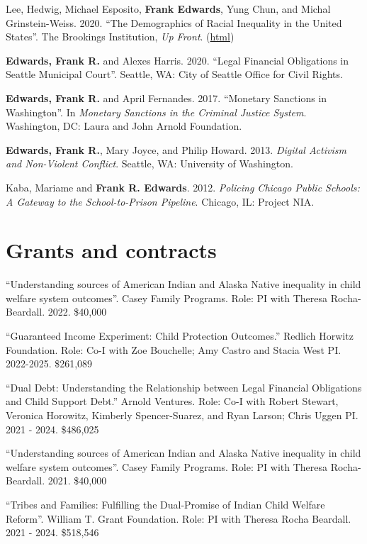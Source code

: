 \documentclass[margin,line]{res}
\begin{document}
\begin{resume}
Lee, Hedwig, Michael Esposito, \textbf{Frank Edwards}, Yung Chun, and Michal Grinstein-Weiss. 2020. ``The Demographics of Racial Inequality in the United States''. The Brookings Institution, \textit{Up Front}. (\href{https://www.brookings.edu/blog/up-front/2020/07/27/the-demographics-of-racial-inequality-in-the-united-states/}{html}) 

\textbf{Edwards, Frank R.} and Alexes Harris. 2020. ``Legal Financial Obligations in Seattle Municipal Court''. Seattle, WA: City of Seattle Office for Civil Rights.

\textbf{Edwards, Frank R.} and April Fernandes. 2017. ``Monetary Sanctions in Washington''. In \textit{Monetary Sanctions in the Criminal Justice System}. Washington, DC: Laura and John Arnold Foundation.

\textbf{Edwards, Frank R.}, Mary Joyce, and Philip Howard. 2013. \textit{Digital Activism and Non-Violent Conflict}. Seattle, WA: University of Washington.

Kaba, Mariame and \textbf{Frank R. Edwards}. 2012. \textit{Policing Chicago Public Schools: A Gateway to the School-to-Prison Pipeline}. Chicago, IL: Project NIA.

\section{\sc Grants and contracts}

``Understanding sources of American Indian and Alaska Native inequality in child welfare system outcomes''. Casey Family Programs. Role: PI with Theresa Rocha-Beardall. 2022. \$40,000

``Guaranteed Income Experiment: Child Protection Outcomes.'' Redlich Horwitz Foundation. Role: Co-I with Zoe Bouchelle; Amy Castro and Stacia West PI. 2022-2025. \$261,089

``Dual Debt: Understanding the Relationship between Legal Financial Obligations and Child Support Debt.'' Arnold Ventures. Role: Co-I with Robert Stewart, Veronica Horowitz, Kimberly Spencer-Suarez, and Ryan Larson; Chris Uggen PI. 2021 - 2024. \$486,025 

``Understanding sources of American Indian and Alaska Native inequality in child welfare system outcomes''. Casey Family Programs. Role: PI with Theresa Rocha-Beardall. 2021. \$40,000

``Tribes and Families: Fulfilling the Dual-Promise of Indian Child Welfare Reform''. William T. Grant Foundation. Role: PI with Theresa Rocha Beardall. 2021 - 2024. \$518,546


\end{resume}
\end{document}
